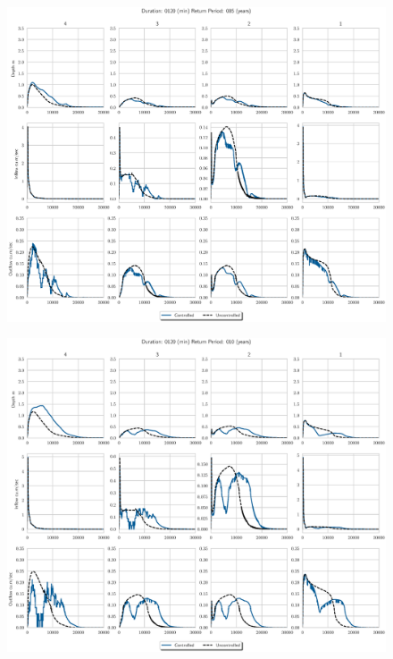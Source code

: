 \begin{figure}
    \centering
    \includegraphics[width=\linewidth]{./RL-SI-figures/77storms/0120005.eps}
\end{figure}
\begin{figure}
    \centering
    \includegraphics[width=\linewidth]{./RL-SI-figures/77storms/0120010.eps}
\end{figure}
